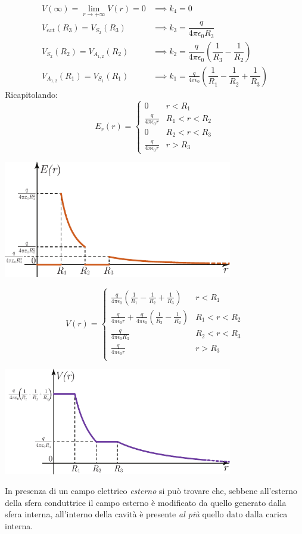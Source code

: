 \begin{align*}
		V(\infty)\displaystyle=\lim_{r\to+\infty}V(r)=0&\implies k_4=0\\
		V_{ext}(R_3)=V_{S_2}(R_3)&\implies k_3=\dfrac{q}{4\pi\epsilon_0R_3}\\
		V_{S_2}(R_2)=V_{A_{1,2}}(R_2)&\implies k_2=\dfrac{q}{4\pi\epsilon_0}\left(\dfrac{1}{R_3}-\dfrac{1}{R_2}\right)\\
		V_{A_{1,2}}(R_1)=V_{S_1}(R_1)&\implies k_1=\frac{q}{4\pi\epsilon_0}\left(\dfrac{1}{R_1}-\dfrac{1}{R_2}+\dfrac{1}{R_3}\right)
\end{align*}
Ricapitolando:
\begin{equation*}
	E_{r}(r)=\begin{cases}
		0 & r<R_1\\
		\frac{q}{4\pi\epsilon_0r} & R_1<r<R_2\\
		0 & R_2<r<R_3\\
		\frac{q}{4\pi\epsilon_0 r} & r>R_3
	\end{cases}
\end{equation*}
\begin{center}
	\includegraphics[width=0.75\textwidth]{images/chp4sferacava2graf1.pdf}
\end{center}
\begin{equation*}
	V(r)=\begin{cases}
		\frac{q}{4\pi\epsilon_0}\left(\frac{1}{R_1}-\frac{1}{R_2}+\frac{1}{R_3}\right) & r<R_1\\
		\frac{q}{4\pi\epsilon_0r}+\frac{q}{4\pi\epsilon_0}\left(\frac{1}{R_3}-\frac{1}{R_2}\right) & R_1<r<R_2\\
		\frac{q}{4\pi\epsilon_0R_3} & R_2<r<R_3\\
		\frac{q}{4\pi\epsilon_0r} & r>R_3\\
	\end{cases}
\end{equation*}
\begin{center}
	\includegraphics[width=0.75\textwidth]{images/chp4sferacava2graf2.pdf}
\end{center}
In presenza di un campo elettrico \textit{esterno} si può trovare che, sebbene all'esterno della sfera conduttrice il campo esterno è modificato da quello generato dalla sfera interna, all'interno della cavità è presente \textit{al più} quello dato dalla carica interna.
